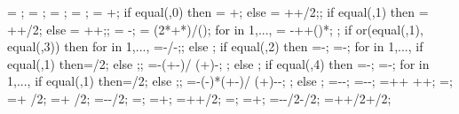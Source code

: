 {{\arrlen = \arrowlenratio*\minlen;
\arrrad = \rotarrowlenratio*\minlen;
\Xaxesstarty = ;
\Yaxesstartx = ;
\Yaxesstarty = \y{\levelnumber}+\axisseperation;
if equal(\showsupports,0) then
{\Xaxesstartx = \x{\columnnumber}+\axisseperation;} else
{\Xaxesstartx = \x{\columnnumber}+\axisseperation+\supportwidth/2;};
if equal(\showsupports,1) then
{\Xaxesstartx = \x{\columnnumber}+\axisseperation+\supportwidth/2;} else
{\Xaxesstartx = \x{\columnnumber}+\axisseperation+\supportwidth;};
\pilecoordy = -\supportheight;
\pilespace = 
(2*\supportwidth+*\pilesidespace)/();
for \pileind in {1,...,{\numberofpiles}}{
\pilecoordx{\pileind} = -\supportwidth+\pilesidespace+()*\pilespace;
};
if or(equal(\latloadtype,1), equal(\latloadtype,3)) then {
for \iarr in {1,...,{\levelnumber}}{
	\arrstartx{\iarr}=-\toparrlen*\y{\iarr}/\structheight-\latloadshift;};
} else {};
if equal(\latloadtype,2) then {
	=-\latloadshift;
	=-\isomidy;
	for \iarr in {1,...,{\levelnumber}}{
		if equal(\iarr,1) then{\addtempy=\supportheight/2;} else {;};
		\arrstartx{\iarr}=-\toparrlen*(\y{\iarr}+\isomidy-\addtempy)/
		(\structheight+\isomidy)-\latloadshift;
	};
} else {};
if equal(\latloadtype,4) then {
	=-\latloadshift;
	=-\isomidy;
	for \iarr in {1,...,{\levelnumber}}{
		if equal(\iarr,1) then{\addtempy=\supportheight/2;} else {;};
		\arrstartx{\iarr}=-(\toparrlen-\basearrlen)*(\y{\iarr}+\isomidy-\addtempy)/
		(\structheight+\isomidy)-\latloadshift-\basearrlen;
	};
} else {};
\engbedrockstartx=-\leftsoildist-\engbedrockleftdist;
\engbedrockstarty=-\soilbelowfoundtof-\engbedrockdepth;
\engbedrockdeltax=\leftsoildist+\engbedrockleftdist+
  \buildingwidth+\rightsoildist+\engbedrockrightdist;
\engbedrockdeltay=\engbedrockdepth;
\engbedrockmidx=\engbedrockstartx + \engbedrockdeltax/2;
\engbedrockmidy=\engbedrockstarty + \engbedrockdeltay/2;
\translayerleftstartx=-\leftsoildist-\translayerlinet/2;
\translayerleftstarty=\leftwallh;
\translayerleftdeltay=\leftwallh+\soilbelowfoundtof;
\translayerrightstartx=\rightsoildist+\buildingwidth+\translayerlinet/2;
\translayerrightstarty=\rightwallh;
\translayerrightdeltay=\rightwallh+\soilbelowfoundtof;
\ssinterleftstartx=-\supportwidth-\baselinet/2-\ssinterlinet/2;
\ssinterrightstartx=\buildingwidth+\supportwidth+\baselinet/2+\ssinterlinet/2;
}}
